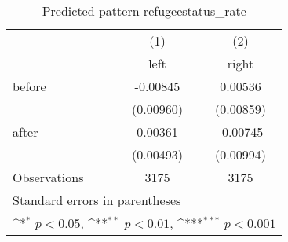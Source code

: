 \begin{table}[htbp]\centering
\def\sym#1{\ifmmode^{#1}\else\(^{#1}\)\fi}
\caption{Predicted pattern refugeestatus\_rate}
\begin{tabular}{l*{2}{c}}
\hline\hline
                    &\multicolumn{1}{c}{(1)}&\multicolumn{1}{c}{(2)}\\
                    &\multicolumn{1}{c}{left}&\multicolumn{1}{c}{right}\\
\hline
before              &    -0.00845         &     0.00536         \\
                    &   (0.00960)         &   (0.00859)         \\
[1em]
after               &     0.00361         &    -0.00745         \\
                    &   (0.00493)         &   (0.00994)         \\
\hline
Observations        &        3175         &        3175         \\
\hline\hline
\multicolumn{3}{l}{\footnotesize Standard errors in parentheses}\\
\multicolumn{3}{l}{\footnotesize \sym{*} \(p<0.05\), \sym{**} \(p<0.01\), \sym{***} \(p<0.001\)}\\
\end{tabular}
\end{table}
